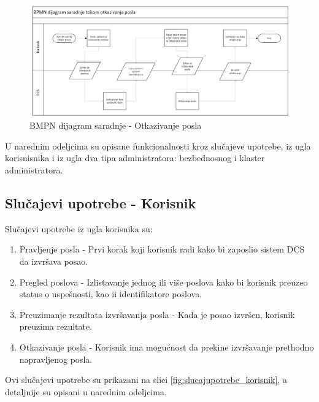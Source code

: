 \documentclass[12pt,oneside]{memoir}
\begin{document}
\begin{figure}[!ht]
  \centering
  \includegraphics[width=1\textwidth]{./images/BPMN_dijagram_saradnje_otkazivanje.png}
  \caption{BMPN dijagram saradnje - Otkazivanje posla}
  \label{fig:bpmn_otkazivanje}
\end{figure}

U narednim odeljcima su opisane funkcionalnosti kroz slučajeve upotrebe, iz ugla korisnisnika i iz ugla dva tipa administratora: bezbednosnog i klaster administratora.

\subsection{Slučajevi upotrebe - Korisnik}

Slučajevi upotrebe iz ugla korisnika su:
\begin{enumerate}
\item Pravljenje posla - Prvi korak koji korisnik radi kako bi zaposlio sistem DCS da izvršava posao.
\item Pregled poslova - Izlistavanje jednog ili više poslova kako bi korisnik preuzeo status o uspešnosti, kao ii identifikatore poslova.
\item Preuzimanje rezultata izvršavanja posla - Kada je posao izvršen, korisnik preuzima rezultate.
\item Otkazivanje posla - Korisnik ima mogućnost da prekine izvršavanje prethodno napravljenog posla.
\end{enumerate}

Ovi slučajevi upotrebe su prikazani na slici \ref{fig:slucajupotrebe_korisnik}, a detaljnije su opisani u narednim odeljcima.
\end{document}
